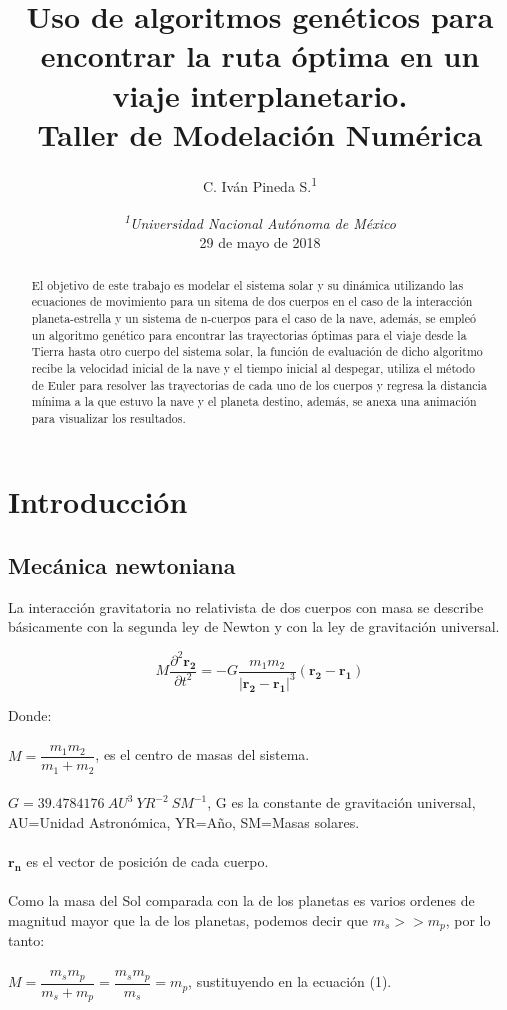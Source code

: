 \documentclass[12pt,letterpaper]{article}
\author{C. Iván Pineda S.\textsuperscript{1} }
\title{Uso de algoritmos genéticos para encontrar la ruta óptima en un viaje interplanetario.\\ Taller de Modelación Numérica}
\date {\textit{\textsuperscript{1}Universidad Nacional Autónoma de México}
\\ 29 de mayo de 2018}
\begin{document}
\maketitle

\begin{abstract}
El objetivo de este trabajo es modelar el sistema solar y su dinámica utilizando las ecuaciones de movimiento para un sitema de dos cuerpos en el caso de la interacción planeta-estrella y un sistema de n-cuerpos para el caso de la nave, además, se empleó un algoritmo genético para encontrar las trayectorias óptimas para el viaje desde la Tierra hasta otro cuerpo del sistema solar, la función de evaluación de dicho algoritmo recibe la velocidad inicial de la nave y el tiempo inicial al despegar, utiliza el método de Euler para resolver las trayectorias de cada uno de los cuerpos y regresa la distancia mínima a la que estuvo la nave y el planeta destino, además, se anexa una animación para visualizar los resultados.
\end{abstract}


\section*{Introducción}

\subsection*{Mecánica newtoniana}

La interacción gravitatoria no relativista de dos cuerpos con masa se describe básicamente con la segunda ley de Newton y con la ley de gravitación universal.

\begin{equation}
 M\dfrac{\partial ^2 \mathbf{r_2}}{\partial t^2}=-G\dfrac{m_1m_2}{|\mathbf{r_{2}}-\mathbf{r_1}|^3}(\mathbf{r_{2}}-\mathbf{r_1})
\end{equation} 

Donde:
\\
\\
$M=\dfrac{m_1m_2}{m_1+m_2}$, es el centro de masas del sistema.
\\
\\
$G=39.4784176 \ AU^3 \ YR^{-2} \ SM^{-1}$, G es la constante de gravitación universal, AU=Unidad Astronómica, YR=Año, SM=Masas solares.
\\
\\
$\mathbf{r_n} $ es el vector de posición de cada cuerpo.
\\
\\
Como la masa del Sol comparada con la de los planetas es varios ordenes de magnitud mayor que la de los planetas, podemos decir que $m_s>>m_p$, por lo tanto:
\\
\\
$M=\dfrac{m_sm_p}{m_s+m_p}=\dfrac{m_sm_p}{m_s}=m_p$, sustituyendo en la ecuación (1).
\end{document}
